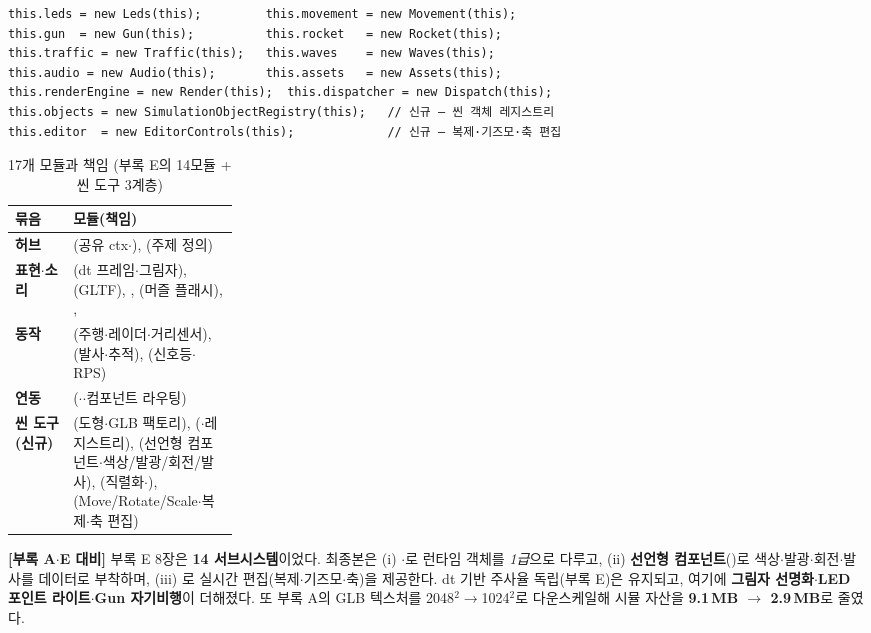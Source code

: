 \begin{verbatim}
this.leds = new Leds(this);         this.movement = new Movement(this);
this.gun  = new Gun(this);          this.rocket   = new Rocket(this);
this.traffic = new Traffic(this);   this.waves    = new Waves(this);
this.audio = new Audio(this);       this.assets   = new Assets(this);
this.renderEngine = new Render(this);  this.dispatcher = new Dispatch(this);
this.objects = new SimulationObjectRegistry(this);   // 신규 — 씬 객체 레지스트리
this.editor  = new EditorControls(this);             // 신규 — 복제·기즈모·축 편집
\end{verbatim}

\begin{table}[htbp]\centering\small
\caption{ 17개 모듈과 책임 (부록 E의 14모듈 + 씬 도구 3계층)}
\renewcommand{\arraystretch}{1.2}
\begin{tabularx}{\linewidth}{@{}>{\sffamily\bfseries}L{0.26\linewidth} >{\raggedright\arraybackslash}X@{}}
\toprule
\sffamily 묶음 & \sffamily 모듈(책임) \\
\midrule
허브 & (공유 ctx$\cdot$), (주제 정의) \\
표현$\cdot$소리 & (dt 프레임$\cdot$그림자), (GLTF), , (머즐 플래시), ,  \\
동작 & (주행$\cdot$레이더$\cdot$거리센서), (발사$\cdot$추적), (신호등$\cdot$RPS) \\
연동 & ($\cdot$$\cdot$컴포넌트 라우팅) \\
씬 도구 (신규) & (도형$\cdot$GLB 팩토리), ($\cdot$레지스트리), (선언형 컴포넌트$\cdot$색상/발광/회전/발사), (직렬화$\cdot$), (Move/Rotate/Scale$\cdot$복제$\cdot$축 편집) \\
\bottomrule
\end{tabularx}
\end{table}

\smallskip
\noindent\textbf{[부록 A$\cdot$E 대비]} 부록 E 8장은 \textbf{14 서브시스템}이었다. 최종본은 (i)
$\cdot$로 런타임 객체를 \emph{1급}으로 다루고, (ii) \textbf{선언형
컴포넌트}()로 색상$\cdot$발광$\cdot$회전$\cdot$발사를 데이터로 부착하며, (iii)
로 실시간 편집(복제$\cdot$기즈모$\cdot$축)을 제공한다. dt 기반 주사율
독립(부록 E)은 유지되고, 여기에 \textbf{그림자 선명화$\cdot$LED 포인트 라이트$\cdot$Gun 자기비행}이
더해졌다. 또 부록 A의 GLB 텍스처를 2048$^2\to$1024$^2$로 다운스케일해 시뮬 자산을
\textbf{9.1\,MB $\to$ 2.9\,MB}로 줄였다.

